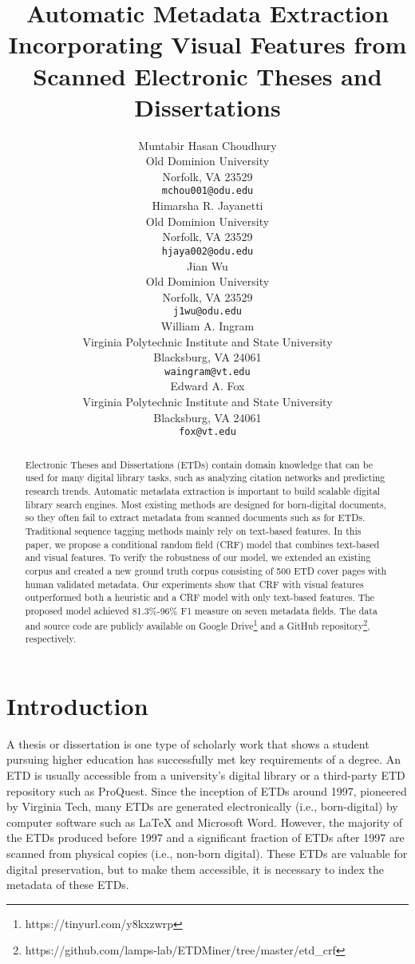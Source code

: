 \documentclass{article}
\title{Automatic Metadata Extraction Incorporating Visual Features from Scanned Electronic Theses and Dissertations}
\author{Muntabir Hasan Choudhury\\
	Old Dominion University\\
	Norfolk, VA 23529 \\
	\texttt{mchou001@odu.edu} \\
	\And
    Himarsha R. Jayanetti\\
    Old Dominion University\\
	Norfolk, VA 23529 \\
	\texttt{hjaya002@odu.edu} \\
	\And
    Jian Wu\\
	Old Dominion University\\
	Norfolk, VA 23529 \\
	\texttt{j1wu@odu.edu} \\
\And
	William A. Ingram \\
	Virginia Polytechnic Institute and State University \\
	Blacksburg, VA 24061 \\
	\texttt{waingram@vt.edu} \\
	\And
	Edward A. Fox \\
	Virginia Polytechnic Institute and State University \\
	Blacksburg, VA 24061 \\
	\texttt{fox@vt.edu} \\
}
\begin{document}
\maketitle

\begin{abstract}
Electronic Theses and Dissertations (ETDs) contain domain knowledge that can be used for many digital library tasks, such as analyzing citation networks and predicting research trends. Automatic metadata extraction is important to build scalable digital library search engines. Most existing methods are designed for born-digital documents, so they often fail to extract metadata from scanned documents such as for ETDs. Traditional sequence tagging methods mainly rely on text-based features. In this paper, we propose a conditional random field (CRF) model that combines text-based and visual features. To verify the robustness of our model, we extended an existing corpus and created a new ground truth corpus consisting of 500 ETD cover pages with human validated metadata. Our experiments show that CRF with visual features outperformed both a heuristic and a CRF model with only text-based features. The proposed model achieved 81.3\%-96\% F1 measure on seven metadata fields. The data and source code are publicly available on Google Drive\footnote{https://tinyurl.com/y8kxzwrp} and a GitHub repository\footnote{https://github.com/lamps-lab/ETDMiner/tree/master/etd\_crf}, respectively.
\end{abstract}



\section{Introduction}
A thesis or dissertation is one type of scholarly work that shows a student pursuing higher education has successfully met key requirements of a degree. An ETD is usually accessible from a university's digital library or a third-party ETD repository such as ProQuest. Since the inception of ETDs around 1997, pioneered by Virginia Tech, many ETDs are generated electronically (i.e., born-digital) by computer software such as LaTeX and Microsoft Word. However, the majority of the ETDs produced before 1997 and a significant fraction of ETDs after 1997 are scanned from physical copies (i.e., non-born digital). These ETDs are valuable for digital preservation, but to make them accessible, it is necessary to index the metadata of these ETDs. 
\end{document}
